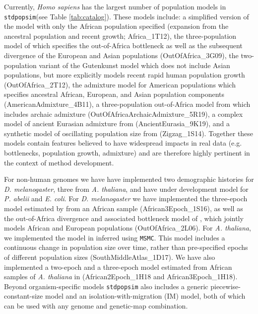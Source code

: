 \documentclass[12pt,halfline,a4paper]{ouparticle}
\newcommand{\stdpopsim}{\texttt{stdpopsim}\xspace}
\newcommand{\MSMC}{\texttt{MSMC}\xspace}
\begin{document}
Currently, {\em Homo sapiens} has the largest number of population models in
\stdpopsim (see Table \ref{tab:catalog}).  
These models include: a simplified version of the \cite{tennessen2012evolution}
model with only the African population specified (expansion from the ancestral
population and recent growth; Africa\_1T12), the three-population model of \cite{gutenkunst2009inferring}
which specifies the out-of-Africa bottleneck as well as the subsequent divergence of
the European and Asian populations (OutOfAfrica\_3G09), the \cite{tennessen2012evolution} two-population variant of the
Gutenkunst model which does not include Asian populations, but more explicitly models
recent rapid human population growth (OutOfAfrica\_2T12), the \cite{browning2018ancestry} admixture model
for American populations which specifies ancestral African, European, and Asian population
components (AmericanAdmixture\_4B11), a three-population out-of-Africa model from \cite{ragsdale2019models}
which includes archaic admixture (OutOfAfricaArchaicAdmixture\_5R19),
a complex model of ancient Eurasian admixture from \cite{kamm2019efficiently} (AncientEurasia\_9K19),
and a synthetic model of oscillating population size from \cite{schiffels2014inferring} (Zigzag\_1S14).
Together these models
contain features believed to have widespread impacts in real data (e.g. bottlenecks, population growth,
admixture) and are therefore highly pertinent in the context of method development.

For non-human genomes we have have implemented two demographic histories for
\emph{D. melanogaster}, three from \emph{A. thaliana}, and have under development
model for \emph{P. abelii} and \emph{E. coli}.
For \emph{D. melanogaster} we have implemented the three-epoch model estimated by \cite{sheehan2016deep} from
an African sample (African3Epoch\_1S16), as well as the out-of-Africa divergence
and associated bottleneck model of \cite{li2006inferring}, which jointly models African
and European populations (OutOfAfrica\_2L06). For \emph{A. thaliana}, we implemented the
model in \cite{durvasula2017african} inferred using \MSMC. This model includes
a continuous change in population size over time, rather than pre-specified epochs of different
population sizes (SouthMiddleAtlas\_1D17). We have also implemented a two-epoch and a three-epoch model estimated from African
samples of \emph{A. thaliana} in \cite{huber2018gene} (African2Epoch\_1H18 and African3Epoch\_1H18). 
Beyond organism-specific models \stdpopsim also includes a generic piecewise-constant-size model and
an isolation-with-migration (IM) model, both of which can be used with any genome and genetic-map combination.
\end{document}
